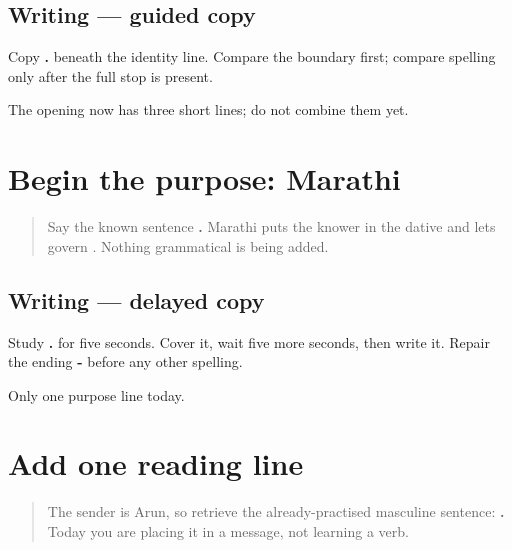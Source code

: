 \subsection*{Writing — guided copy}
Copy \textbf{  .} beneath the identity line. Compare the boundary first; compare spelling only after the full stop is present.

\begin{tcolorbox}[breakable,colback=teal!4,colframe=teal!35!black,title={Before you move on}]
The opening now has three short lines; do not combine them yet.
\end{tcolorbox}
\section[\texorpdfstring{\mr{मला} \mr{मराठी} \mr{येते}. (malā marāṭhī yete)}{मला मराठी येते. (malā marāṭhī yete)}]{Begin the purpose: Marathi}

\label{lesson:MR-A1M04-language-line}



\begin{quote}
Say the known sentence \textbf{  .} Marathi puts the knower in the dative and lets \textbf{} govern \textbf{}. Nothing grammatical is being added.
\end{quote}

\subsection*{Writing — delayed copy}
Study \textbf{  .} for five seconds. Cover it, wait five more seconds, then write it. Repair the ending \textbf{-} before any other spelling.

\begin{tcolorbox}[breakable,colback=teal!4,colframe=teal!35!black,title={Before you move on}]
Only one purpose line today.
\end{tcolorbox}
\section[\texorpdfstring{\mr{मी} \mr{मराठी} \mr{वाचतो}. (mī marāṭhī vāchto)}{मी मराठी वाचतो. (mī marāṭhī vāchto)}]{Add one reading line}

\label{lesson:MR-A1M05-reading-line}



\begin{quote}
The sender is Arun, so retrieve the already-practised masculine sentence: \textbf{  .} Today you are placing it in a message, not learning a verb.
\end{quote}

